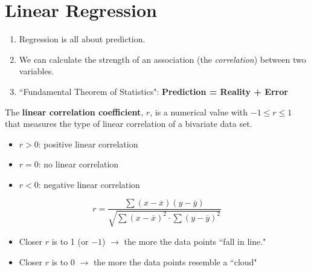 \documentclass{article}
\begin{document}
\section*{Linear Regression}

\begin{tcolorbox}[colframe=orange!70!white, coltitle=black, title=\textbf{Summary}]
\begin{enumerate}
    \item Regression is all about prediction.
    \item We can calculate the strength of an association (the \textit{correlation}) between two variables.
    \item ``Fundamental Theorem of Statistics": \textbf{Prediction = Reality + Error}
\end{enumerate}
\end{tcolorbox}
\vspace{0.75in}

\begin{tcolorbox}[colframe=green!20!black, colback = green!30!white,title=\textbf{Linear Correlation Coefficient}]
The \textbf{linear correlation coefficient}, $r$, is a numerical value with $-1 \leq r \leq 1$ that measures the type of linear correlation of a bivariate data set.
\end{tcolorbox}
\vspace{0.5in}

\begin{itemize}
	\item $r > 0$: positive linear correlation
	\item $r = 0$: no linear correlation
	\item $r < 0$: negative linear correlation
\end{itemize}
\vspace{0.5in}

\[r = \frac{\sum (x-\overline{x})(y-\overline{y})}{\sqrt{\sum(x-\overline{x})^2 \cdot \sum(y-\overline{y})^2}}\]	
\vspace{0.5in}

\begin{itemize}
    \item Closer $r$ is to 1 (or $-1$) $\longrightarrow$ the more the data points ``fall in line."
    \item Closer $r$ is to 0 $\longrightarrow$ the more the data points resemble a ``cloud"
\end{itemize}

\vfill 
\end{document}
